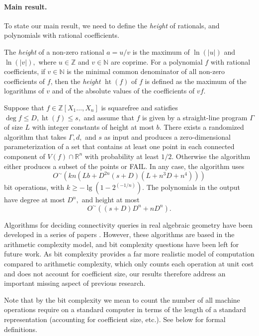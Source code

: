 \documentclass[sigconf]{acmart}
\DeclareMathOperator{\htt}{ht}
\def\ZZ{\mathbb{Z}}
\def\R{\mathbb{R}}
\newcommand{\ZZ}{{\mathbb{Z}}}
\begin{document}
\paragraph*{Main result.} To state our main result, we need to define 
the {\em height} of rationals, and polynomials with rational
coefficients.

The {\em height} of a non-zero rational $a=u/v$ is the maximum of
$\ln(|u|)$ and $\ln(|v|),$ where $u \in \mathbb{Z}$ and $v \in
\mathbb{N}$ are coprime. For a polynomial $f$ with rational
coefficients, if $v \in \mathbb N$ is the minimal common denominator
of all non-zero coefficients of $f$, then the \textit{height}
$\htt(f)$ of $f$ is defined as the maximum of the logarithms of $v$
and of the absolute values of the coefficients of $vf$.


\begin{theorem}
Suppose that $f\in\ZZ[X_1\hdots,X_n]$ is squarefree and satisfies $\deg
f \leq D, \htt(f) \leq s,$ and assume that $f$ is given by a
straight-line program $\Gamma$ of size $L$ with integer constants of
height at most $b.$ There exists a randomized algorithm that takes
$\Gamma, d,$ and $s$ as input and produces a zero-dimensional
parameterization of a set that contains at least one point in each
connected component of $V(f) \cap \R^n$ with probability at least
$1/2$. Otherwise the algorithm either produces a subset of the points
or FAIL. In any case, the algorithm uses
\[
O^{\sim}(kn(Lb+D^{2n}(s+D)(L+n^3D+n^4)))
\]
bit operations, with $k \geq -\lg(1-2^{(-1/n)})$. The polynomials in the output have degree at most $D^n,$ and height at most
\[
O^{\sim}((s+D)D^n + nD^n).
\]
\end{theorem}

Algorithms for deciding connectivity queries in real algebraic geometry
have been developed in a series of papers
\cite{EMP,SchostMohabBabySteps2011,SchostMohabBabySteps2014,TWT}. However,
these algorithms are based in the arithmetic complexity model, and bit
complexity questions have been left for future work. As bit complexity
provides a far more realistic model of computation compared to arithmetic
complexity,  which only counts each operation at unit cost and does not
account for coefficient size, our results therefore address an important
missing aspect of previous research.

Note that by the bit complexity we mean to count the number of all machine
operations require on a standard computer in terms of the length of a
standard representation (accounting for coefficient size, etc.). See below
for formal definitions.
\end{document}

